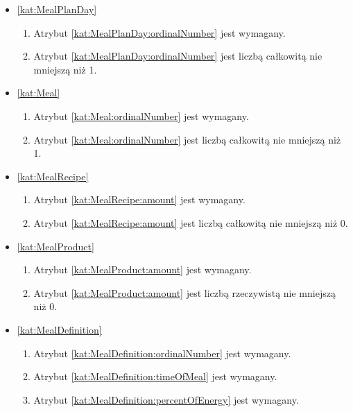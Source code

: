 \begin{itemize}[label={\textbf{Ograniczenia dla}}, wide, labelwidth=!, labelindent=0pt]
    \item\ref{kat:MealPlanDay}\mynobreakpar
    \begin{enumerate}[label={\textbf{OGR/4/\protect\twodigits{\arabic{enumi}}}}, wide, labelwidth=!, align=left, leftmargin=3cm, resume]
        \item Atrybut \ref{kat:MealPlanDay:ordinalNumber} jest wymagany.

        \item Atrybut \ref{kat:MealPlanDay:ordinalNumber} jest liczbą całkowitą nie mniejszą niż 1.
    \end{enumerate}

    \item\ref{kat:Meal}\mynobreakpar
    \begin{enumerate}[label={\textbf{OGR/4/\protect\twodigits{\arabic{enumi}}}}, wide, labelwidth=!, align=left, leftmargin=3cm, resume]
        \item Atrybut \ref{kat:Meal:ordinalNumber} jest wymagany.

        \item Atrybut \ref{kat:Meal:ordinalNumber} jest liczbą całkowitą nie mniejszą niż 1.
    \end{enumerate}

    \item\ref{kat:MealRecipe}\mynobreakpar
    \begin{enumerate}[label={\textbf{OGR/4/\protect\twodigits{\arabic{enumi}}}}, wide, labelwidth=!, align=left, leftmargin=3cm, resume]
        \item Atrybut \ref{kat:MealRecipe:amount} jest wymagany.

        \item Atrybut \ref{kat:MealRecipe:amount} jest liczbą całkowitą nie mniejszą niż 0.
    \end{enumerate}

    \item\ref{kat:MealProduct}\mynobreakpar
    \begin{enumerate}[label={\textbf{OGR/4/\protect\twodigits{\arabic{enumi}}}}, wide, labelwidth=!, align=left, leftmargin=3cm, resume]
        \item Atrybut \ref{kat:MealProduct:amount} jest wymagany.

        \item Atrybut \ref{kat:MealProduct:amount} jest liczbą rzeczywistą nie mniejszą niż 0.
    \end{enumerate}

    \item\ref{kat:MealDefinition}\mynobreakpar
    \begin{enumerate}[label={\textbf{OGR/4/\protect\twodigits{\arabic{enumi}}}}, wide, labelwidth=!, align=left, leftmargin=3cm, resume]
        \item Atrybut \ref{kat:MealDefinition:ordinalNumber} jest wymagany.
        \item Atrybut \ref{kat:MealDefinition:timeOfMeal} jest wymagany.
        \item Atrybut \ref{kat:MealDefinition:percentOfEnergy} jest wymagany.


\end{enumerate}
\end{itemize}
